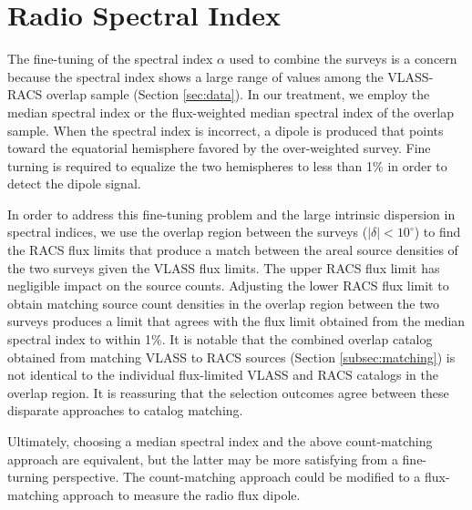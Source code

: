 \documentclass[twocolumn]{aastex63}
\begin{document}
\section{Radio Spectral Index}

The fine-tuning of the spectral index $\alpha$ used to combine the surveys is a concern because the spectral index shows
a large range of values among the VLASS-RACS overlap sample (Section \ref{sec:data}).  In our treatment, we employ the median
spectral index or the flux-weighted median spectral index of the
overlap sample.  When the spectral index is incorrect, a dipole is produced that points toward the equatorial hemisphere favored by the
over-weighted survey.  Fine turning is required to equalize the two hemispheres to less than 1\% in order to detect the dipole
signal.

In order to address this fine-tuning problem and the large intrinsic dispersion in spectral indices, we use the overlap region between
the surveys ($|\delta| < 10^\circ$) to find the RACS flux limits that produce a match between the areal source densities of the two surveys given the VLASS flux
limits.  The upper RACS flux limit has negligible impact on the source counts.  Adjusting the lower RACS flux limit to obtain matching
source count densities in the overlap region between the two surveys produces a limit that agrees with the flux limit obtained from the
median spectral index to within 1\%.  It is notable that the combined overlap catalog obtained from matching VLASS to RACS sources
(Section \ref{subsec:matching}) is not identical to the individual flux-limited VLASS and RACS catalogs in the overlap region.  It is
reassuring that the selection outcomes agree between these disparate approaches to catalog matching.

Ultimately, choosing a median spectral index and the above count-matching approach are equivalent, but the latter may be
more satisfying from a fine-turning perspective.  The count-matching approach could be modified to a flux-matching approach
to measure the radio flux dipole.   
\end{document}
